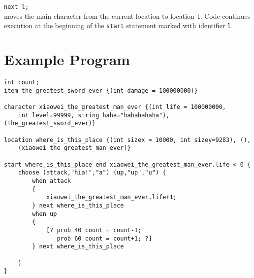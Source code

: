 \documentclass[12pt]{article}
\begin{document}
\texttt{next l;} \\

\noindent moves the main character from the current location to location \texttt{l}.  Code continues execution at the beginning of the \texttt{start} statement marked with identifier \texttt{l}.

\section{Example Program}

\begin{verbatim}
int count;
item the_greatest_sword_ever {(int damage = 100000000)}

character xiaowei_the_greatest_man_ever {(int life = 100000000, 
    int level=99999, string haha="hahahahaha"), (the_greatest_sword_ever)}

location where_is_this_place {(int sizex = 10000, int sizey=9283), (),
    (xiaowei_the_greatest_man_ever)}

start where_is_this_place end xiaowei_the_greatest_man_ever.life < 0 {
    choose (attack,"hia!","a") (up,"up","u") {
        when attack 
        {
            xiaowei_the_greatest_man_ever.life+1;
        } next where_is_this_place
        when up 
        {
            [? prob 40 count = count-1;
               prob 60 count = count+1; ?]
        } next where_is_this_place
		
    }
}
\end{verbatim}
\end{document}
